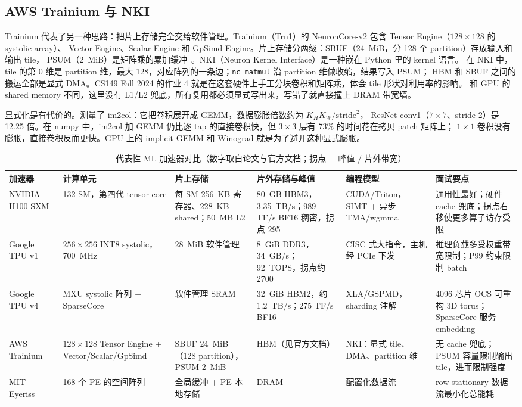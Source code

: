 \subsection{AWS Trainium 与 NKI}

Trainium 代表了另一种思路：把片上存储完全交给软件管理。Trainium（Trn1）的 NeuronCore-v2 包含 Tensor Engine（$128\times128$ 的 systolic array）、
Vector Engine、Scalar Engine 和 GpSimd Engine。片上存储分两级：SBUF（24~MiB，分 128 个 partition）存放输入和输出 tile，
PSUM（2~MiB）是矩阵乘的累加缓冲~\cite{awsneuron}。NKI（Neuron Kernel Interface）是一种嵌在 Python 里的 kernel 语言。
在 NKI 中，tile 的第 0 维是 partition 维，最大 128，对应阵列的一条边；\texttt{nc\_matmul} 沿 partition 维做收缩，结果写入 PSUM；
HBM 和 SBUF 之间的搬运全部是显式 DMA。CS149 Fall 2024 的作业 4 就是在这套硬件上手工分块卷积和矩阵乘，体会 tile 形状对利用率的影响。
和 GPU 的 shared memory 不同，这里没有 L1/L2 兜底，所有复用都必须显式写出来，写错了就直接撞上 DRAM 带宽墙。

显式化是有代价的。测量了 im2col：它把卷积展开成 GEMM，数据膨胀倍数约为 $K_HK_W/\text{stride}^2$，
ResNet conv1（$7\times7$、stride 2）是 12.25 倍。在 numpy 中，im2col 加 GEMM 仍比逐 tap 的直接卷积快，但 $3\times3$ 层有 73\% 的时间花在拷贝 patch 矩阵上；
$1\times1$ 卷积没有膨胀，直接卷积反而更快。GPU 上的 implicit GEMM 和 Winograd 就是为了避开这种显式膨胀。

\begin{table}[!t]
\centering
\caption{代表性 ML 加速器对比（数字取自论文与官方文档；拐点 = 峰值 / 片外带宽）}
\label{tab:accel}
\footnotesize
\begin{tabularx}{\textwidth}{@{}l L{2.6cm} L{2.8cm} L{3.0cm} Y Y@{}}
\toprule
加速器 & 计算单元 & 片上存储 & 片外存储与峰值 & 编程模型 & 面试要点 \\
\midrule
NVIDIA H100 SXM~\cite{nvidiah100} & 132 SM，第四代 tensor core & 每 SM 256~KB 寄存器、228~KB shared；50~MB L2 & 80~GB HBM3，3.35~TB/s；989 TF/s BF16 稠密，拐点 295 & CUDA/Triton，SIMT + 异步 TMA/wgmma & 通用性最好；硬件 cache 兜底；拐点右移使更多算子访存受限 \\
Google TPU v1~\cite{jouppi2017tpu} & $256\times256$ INT8 systolic，700~MHz & 28~MiB 软件管理 & 8~GiB DDR3，34~GB/s；92~TOPS，拐点约 2700 & CISC 式大指令，主机经 PCIe 下发 & 推理负载多受权重带宽限制；P99 约束限制 batch \\
Google TPU v4~\cite{jouppi2023tpuv4} & MXU systolic 阵列 + SparseCore & 软件管理 SRAM & 32~GiB HBM2，约 1.2~TB/s；275 TF/s BF16 & XLA/GSPMD，sharding 注解 & 4096 芯片 OCS 可重构 3D torus；SparseCore 服务 embedding \\
AWS Trainium~\cite{awsneuron} & $128\times128$ Tensor Engine + Vector/Scalar/GpSimd & SBUF 24~MiB（128 partition），PSUM 2~MiB & HBM（见官方文档） & NKI：显式 tile、DMA、partition 维 & 无 cache 兜底；PSUM 容量限制输出 tile，进而限制强度 \\
MIT Eyeriss~\cite{chen2016eyeriss} & 168 个 PE 的空间阵列 & 全局缓冲 + PE 本地存储 & DRAM & 配置化数据流 & row-stationary 数据流最小化总能耗 \\
\bottomrule
\end{tabularx}
\end{table}


